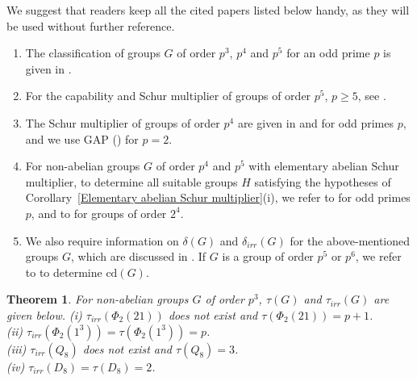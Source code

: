 \documentclass[a4paper,11pt]{amsart}
\numberwithin{equation}{section}
\numberwithin{equation}{subsection}
\newtheorem{theorem}{Theorem}[section]
\newcommand{\C}{\mathbb{C}}
\newcommand{\irr}{\mathrm{Irr}}
\newcommand{\tra}{\operatorname{tra}}
\newcommand{\Nayak}[1]{{\color{red} #1}}
\newcommand{\poonam}[1]{{\color{blue} #1}}
\begin{document}

We suggest that readers keep all the cited papers listed below handy, as they will be used without further reference.
\begin{enumerate}
\item The classification of groups $G$ of order $p^3$, $p^4$ and $p^5$ for an odd prime $p$ is given in \cite{james}. 

\item For the capability and Schur multiplier of groups of order $p^5$, $p\geq 5$, see \cite[Table 1 and Table 2]{hatuip5}.

\item The Schur multiplier of groups of order $p^4$ are given in \cite{Ellis} and \cite{OK} for odd primes $p$, and we use GAP (\cite{GAP4}) for $p=2$.

\item For non-abelian groups $G$ of order $p^4$ and $p^5$ with elementary abelian Schur multiplier, to determine all suitable groups $H$ satisfying the hypotheses of Corollary~\ref{Elementary abelian Schur multiplier}(i), we refer to \cite[Table~4.1]{james} for odd primes $p$, and to \cite{hall2n} for groups of order $2^4$.

\item We also require information on $\delta(G)$ and $\delta_{irr}(G)$ for the above-mentioned groups $G$, which are discussed in \cite{kaur}. If $G$ is a group of order $p^5$ or $p^6$, we refer to \cite[Table~4.1]{james} to determine $\mathrm{cd}(G)$. 
\end{enumerate}
\begin{theorem} \label{Groups of order $p^3$}
For non-abelian groups $G$ of order $p^3$,  $\tau(G)$ and $\tau_{irr}(G)$ are given below.
(i) $\tau_{irr}(\Phi_2(21))$ does not exist and $\tau(\Phi_2(21)) =p+1$. \\
(ii) $\tau_{irr}(\Phi_2(1^3)) = \tau(\Phi_2(1^3)) =p$. \\
(iii) $\tau_{irr}(Q_8)$ does not exist and  $\tau(Q_8) =3$.  \\
(iv) $\tau_{irr}(D_8) = \tau(D_8) =2$. 

\end{theorem}
\end{document}
